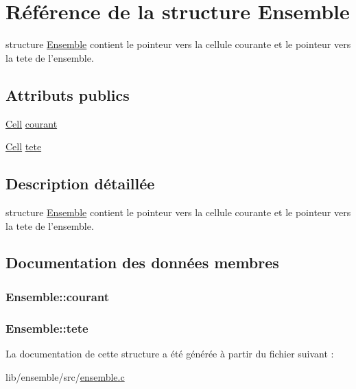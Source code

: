 \hypertarget{structEnsemble}{\section{\-Référence de la structure \-Ensemble}
\label{structEnsemble}
}


structure \hyperlink{structEnsemble}{\-Ensemble} contient le pointeur vers la cellule courante et le pointeur vers la tete de l'ensemble.  


\subsection*{\-Attributs publics}
\begin{DoxyCompactItemize}
\item 
\hyperlink{structCell}{\-Cell} \hyperlink{structEnsemble_afbafd35dda55d92710843882b672866a}{courant}
\item 
\hyperlink{structCell}{\-Cell} \hyperlink{structEnsemble_aa5ae228aceef0a0615f6390246673b07}{tete}
\end{DoxyCompactItemize}


\subsection{\-Description détaillée}
structure \hyperlink{structEnsemble}{\-Ensemble} contient le pointeur vers la cellule courante et le pointeur vers la tete de l'ensemble. 

\subsection{\-Documentation des données membres}
\hypertarget{structEnsemble_afbafd35dda55d92710843882b672866a}{
\subsubsection[{courant}]{ {\bf \-Ensemble\-::courant}}}\label{structEnsemble_afbafd35dda55d92710843882b672866a}
\hypertarget{structEnsemble_aa5ae228aceef0a0615f6390246673b07}{
\subsubsection[{tete}]{ {\bf \-Ensemble\-::tete}}}\label{structEnsemble_aa5ae228aceef0a0615f6390246673b07}


\-La documentation de cette structure a été générée à partir du fichier suivant \-:\begin{DoxyCompactItemize}
\item 
lib/ensemble/src/\hyperlink{ensemble_8c}{ensemble.\-c}\end{DoxyCompactItemize}
